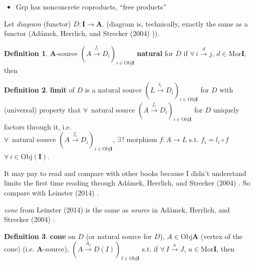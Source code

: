 \documentclass[twoside,landscape,10pt]{amsart}
\theoremstyle{plain}
\theoremstyle{definition}
\newtheorem{definition}{Definition}
\theoremstyle{remark}
\begin{document}
\begin{multicols*}{2}
\begin{itemize}
\item $\text{Grp}$ has nonconcrete coproducts, ``free products''
\end{itemize}

Let \emph{diagram} (functor) $D: \mathbf{I} \to \mathbf{A}$.  (diagram is, technically, exactly the same as a functor (Ad\'{a}mek, Herrlich, and Strecker (2004) \cite{AHS2004})).  

\begin{definition}
  $\mathbf{A}$-source $(A\xrightarrow{f_i}D_i)_{i\in \text{Obj}\mathbf{I}}$ \textbf{natural} for $D$ if $\forall \, i\xrightarrow{ d } j $, $d\in \text{Mor}\mathbf{I}$, then 

\end{definition}

\begin{definition}
 \textbf{ limit } of $D$ is a natural source $(L \xrightarrow{l_i} D_i )_{i\in \text{Obj}\mathbf{I}}$ for $D$ with \\
(universal) property that $\forall \, $ natural source $(A\xrightarrow{f_i} D_i)_{i \in \text{Obj}\mathbf{I}}$ for $D$ uniquely factors through it, i.e. \\
$\forall \, $ natural source $(A\xrightarrow{f_i} D_i)_{i \in \text{Obj}\mathbf{I}}$, $\exists \, !$ morphism $f:A \to L$ s.t. $f_i = l_i \circ f$ \qquad \, $\forall \, i \in \text{Obj}(\mathbf{I})$.  
\end{definition}

It may pay to read and compare with other books because I didn't understand limits the first time reading through Ad\'{a}mek, Herrlich, and Strecker (2004) \cite{AHS2004}.  So compare with Leinster (2014) \cite{Lein2014}.  

\emph{cone} from Leinster (2014) \cite{Lein2014} is the same as \emph{source} in Ad\'{a}mek, Herrlich, and Strecker (2004) \cite{AHS2004}:

\begin{definition}
  \textbf{cone} on $D$ (or natural source for $D$), $A \in \text{Obj}\mathbf{A}$ (vertex of the cone) (i.e. $\mathbf{A}$-source), $(A\xrightarrow{ A_I} D(I))_{I \in \text{Obj}\mathbf{I}}$ s.t. if $\forall \, I \xrightarrow{u} J$, $u\in \text{Mor}\mathbf{I}$, then 


\end{definition}
\end{multicols*}
\end{document}
